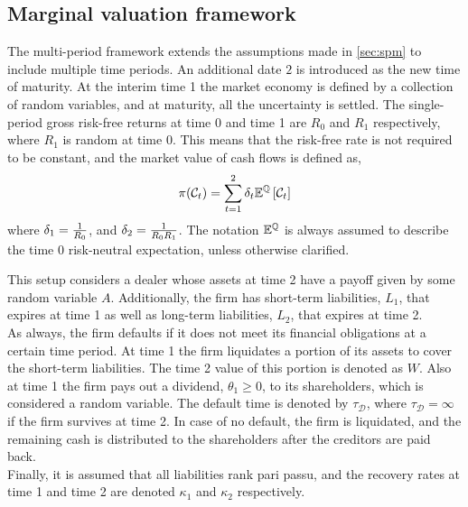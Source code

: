 \documentclass[main.tex]{subfiles}
\begin{document}
    \subsection{Marginal valuation framework}
        The multi-period framework extends the assumptions made in \cref{sec:spm} to include multiple time periods.
        An additional date $2$ is introduced as the new time of maturity.
        At the interim time 1 the market economy is defined by a collection of random variables,
        and at maturity, all the uncertainty is settled. 
        The single-period gross risk-free returns at time 0 and time 1 are $R_0$ and $R_1$ respectively, where $R_1$ is random at time 0.
        This means that the risk-free rate is not required to be constant,
        and the market value of cash flows is defined as,
        \begin{equation}
        \pi(\mathcal{C}_{t}) = \sum_{t=1}^{2}\delta_t \mathbb{E}^{\mathbb{Q}}\left[\mathcal{C}_{t}\right]
        \end{equation}
        where $\delta_1 = \frac{1}{R_{0}}$,
        and $\delta_2 = \frac{1}{R_{0}R_{1}}$.
        The notation $\mathbb{E}^{\mathbb{Q}}$ is always assumed to describe the time 0 risk-neutral expectation, unless otherwise clarified.

        This setup considers a dealer whose assets at time 2 have a payoff given by some random variable $A$.
        Additionally, the firm has short-term liabilities, $L_1$, that expires at time 1 as well as long-term liabilities, $L_2$, that expires at time 2.
        \\
        As always, the firm defaults if it does not meet its financial obligations at a certain time period.
        At time 1 the firm liquidates a portion of its assets to cover the short-term liabilities.
        The time 2 value of this portion is denoted as $W$.
        Also at time 1 the firm pays out a dividend, $\theta_1 \geq 0$, to its shareholders,
        which is considered a random variable.
        The default time is denoted by $\tau_{\mathcal{D}}$,
        where $\tau_{\mathcal{D}} = \infty$ if the firm survives at time 2.
        In case of no default, the firm is liquidated, and the remaining cash is distributed to the shareholders after the creditors are paid back.
        \\
        Finally, it is assumed that all liabilities rank pari passu,
        and the recovery rates at time 1 and time 2 are denoted $\kappa_1$ and $\kappa_2$ respectively.
\end{document}
